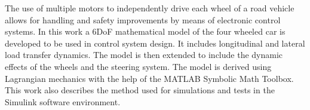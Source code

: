 \documentclass[11pt,english]{toptesi}
\begin{document}
\english

\frontespizio




\frontmatter

%

%



\sommario
The use of multiple motors to independently drive each wheel of a road vehicle allows for handling and safety improvements by means of electronic control systems.
In this work a 6DoF mathematical model of the four wheeled car is developed to be used in control system design. It includes longitudinal and lateral load transfer dynamics. The model is then extended to include the dynamic effects of the wheels and the steering system.
The model is derived using Lagrangian mechanics with the help of the MATLAB Symbolic Math Toolbox.
This work also describes the method used for simulations and tests in the Simulink software environment.
\end{document}
